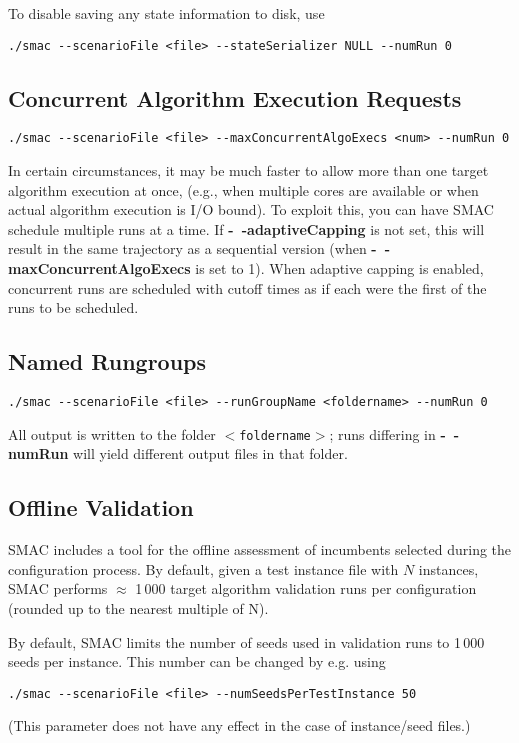 To disable saving any state information to disk, use 
\begin{verbatim}
./smac --scenarioFile <file> --stateSerializer NULL --numRun 0
\end{verbatim}


\subsection{Concurrent Algorithm Execution Requests}
\begin{verbatim}
./smac --scenarioFile <file> --maxConcurrentAlgoExecs <num> --numRun 0
\end{verbatim}

In certain circumstances, it may be much faster to allow more than one target algorithm execution at once,
(e.g., when multiple cores are available or when actual algorithm execution is I/O bound). 
To exploit this, you can have SMAC schedule multiple runs at a time. If \textbf{-~$\!$-adaptiveCapping} is not set, this will result in the same trajectory as a sequential version (when \textbf{-~$\!$-maxConcurrentAlgoExecs} is set to 1). When adaptive capping is enabled, concurrent runs are scheduled with cutoff times as if each were the first of the runs to be scheduled.


\subsection{Named Rungroups}
\begin{verbatim}
./smac --scenarioFile <file> --runGroupName <foldername> --numRun 0
\end{verbatim}
All output is written to the folder \texttt{$<$foldername$>$}; runs differing in \textbf{-~$\!$-numRun} will yield different output files in that folder.


\subsection{Offline Validation}

SMAC includes a tool for the offline assessment of incumbents selected during the configuration process.
By default, given a test instance file with $N$ instances, SMAC performs $\approx$ 1\,000 target algorithm validation runs per configuration (rounded up to the nearest multiple of N).

By default, SMAC limits the number of seeds used in validation runs to 1\,000 seeds per instance. This number can be changed by e.g. using 
\begin{verbatim}
./smac --scenarioFile <file> --numSeedsPerTestInstance 50
\end{verbatim}
(This parameter does not have any effect in the case of instance/seed files.)


